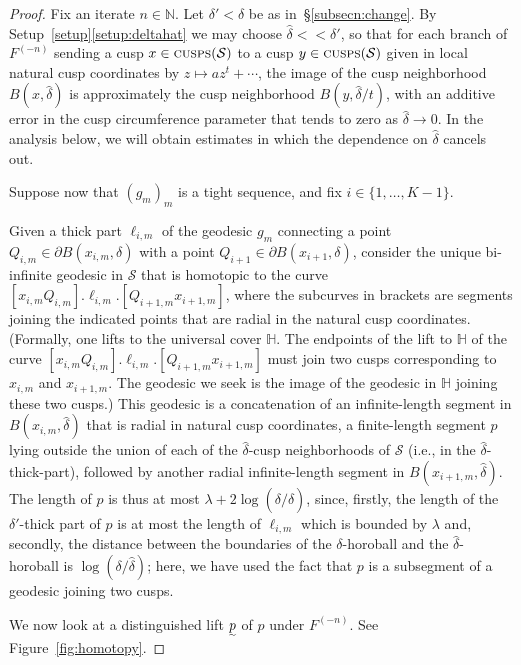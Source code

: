 \documentclass{amsart}
\newcommand\IH{{\mathbb{H}}}
\newcommand\N{{\mathbb{N}}}
\theoremstyle{definition}
\theoremstyle{remark}
\newcommand{\cS}{\mathcal{S}}
\newcommand{\cusps}[1]{\text{\sc cusps}(#1)}
\renewcommand\ll{<\!\!<}
\begin{document}
\begin{proof} Fix an iterate $n\in \N$.  Let $\delta'<\delta$ be as in~\S\ref{subsecn:change}.  By Setup~\ref{setup}\eqref{setup:deltahat} we may choose $\hat{\delta}\ll \delta'$, so that for each branch of $F^{(-n)}$ sending a cusp $x\in \cusps{\cS}$ to a cusp $y\in \cusps{\cS}$ given in local natural cusp coordinates by $z \mapsto az^t+\cdots$, the image of the cusp neighborhood $B(x, \hat{\delta})$  is approximately the cusp neighborhood $B(y,  \hat{\delta}/t)$, with an additive error in the cusp circumference parameter that tends to zero as $\hat{\delta}\to 0$. In the analysis below, we will obtain estimates in which the dependence on $\hat{\delta}$ cancels out. 

Suppose now that $(g_m)_m$ is a tight sequence, and fix $i\in \{1, \ldots,K-1\}$.

Given a thick part $\ell_{i,m}$ of the geodesic $g_m$ connecting a point $Q_{i,m}\in \partial B(x_{i,m}, \delta)$ with a point $Q_{i+1}\in \partial B(x_{i+1},\delta)$, consider the unique bi-infinite geodesic in $\cS$ that is homotopic to the curve $[x_{i,m}Q_{i,m}].\ell_{i,m}.[Q_{i+1,m}x_{i+1,m}]$, where the subcurves in brackets are segments joining the indicated points that are radial in the natural cusp coordinates.  (Formally, one lifts to the universal cover $\IH$.   The endpoints of the lift to $\IH$ of the curve $[x_{i,m}Q_{i,m}].\ell_{i,m}.[Q_{i+1,m}x_{i+1,m}]$ must join two cusps corresponding to $x_{i,m}$ and $x_{i+1,m}$.  The geodesic we seek is the image of the geodesic in $\IH$ joining these two cusps.) This geodesic is a concatenation of an infinite-length segment in $B(x_{i,m},\hat{\delta})$ that is radial in natural cusp coordinates, a finite-length segment $p$ lying outside the union of each of the $\hat{\delta}$-cusp neighborhoods of $\cS$ (i.e., in the $\hat{\delta}$-thick-part), followed by another radial infinite-length segment in $B(x_{i+1,m},\hat{\delta})$.  The length of $p$ is thus at most $\lambda+2\log(\delta/\hat{\delta})$, since, firstly, the length of the $\delta'$-thick part of $p$ is at most the length of $\ell_{i,m}$ which is bounded by $\lambda$ and, secondly, the distance between the boundaries of the $\delta$-horoball and the $\hat{\delta}$-horoball is $\log(\delta/\hat{\delta})$; here, we have used the fact that $p$ is a subsegment of a geodesic joining two cusps. 
 
We now look at a distinguished lift $\undertilde{p}$ of $p$ under $F^{(-n)}$.  See Figure~\ref{fig:homotopy}.
 

\end{proof}
\end{document}
